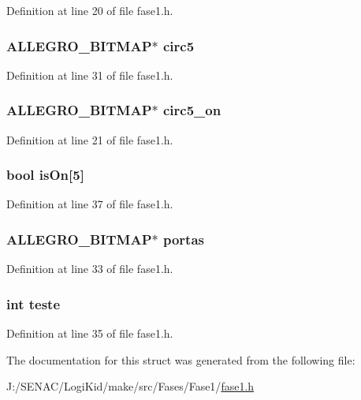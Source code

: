 Definition at line 20 of file fase1.\-h.

\hypertarget{struct_level_one_a6444f15bb917b382f7e91576f46c2706}{
\subsubsection[{circ5}]{\setlength{\rightskip}{0pt plus 5cm}A\-L\-L\-E\-G\-R\-O\-\_\-\-B\-I\-T\-M\-A\-P$\ast$ circ5}}\label{struct_level_one_a6444f15bb917b382f7e91576f46c2706}


Definition at line 31 of file fase1.\-h.

\hypertarget{struct_level_one_a1537bde5184cc347504f101c712fb0ee}{
\subsubsection[{circ5\-\_\-on}]{\setlength{\rightskip}{0pt plus 5cm}A\-L\-L\-E\-G\-R\-O\-\_\-\-B\-I\-T\-M\-A\-P$\ast$ circ5\-\_\-on}}\label{struct_level_one_a1537bde5184cc347504f101c712fb0ee}


Definition at line 21 of file fase1.\-h.

\hypertarget{struct_level_one_a59f6fe985ed5513f62660b2926c812aa}{
\subsubsection[{is\-On}]{\setlength{\rightskip}{0pt plus 5cm}bool is\-On\mbox{[}5\mbox{]}}}\label{struct_level_one_a59f6fe985ed5513f62660b2926c812aa}


Definition at line 37 of file fase1.\-h.

\hypertarget{struct_level_one_a6c47128335a6e9846fb9576bace5a597}{
\subsubsection[{portas}]{\setlength{\rightskip}{0pt plus 5cm}A\-L\-L\-E\-G\-R\-O\-\_\-\-B\-I\-T\-M\-A\-P$\ast$ portas}}\label{struct_level_one_a6c47128335a6e9846fb9576bace5a597}


Definition at line 33 of file fase1.\-h.

\hypertarget{struct_level_one_a71237b18c216e02629593b1969cff245}{
\subsubsection[{teste}]{\setlength{\rightskip}{0pt plus 5cm}int teste}}\label{struct_level_one_a71237b18c216e02629593b1969cff245}


Definition at line 35 of file fase1.\-h.



The documentation for this struct was generated from the following file\-:\begin{DoxyCompactItemize}
\item 
J\-:/\-S\-E\-N\-A\-C/\-Logi\-Kid/make/src/\-Fases/\-Fase1/\hyperlink{fase1_8h}{fase1.\-h}\end{DoxyCompactItemize}
